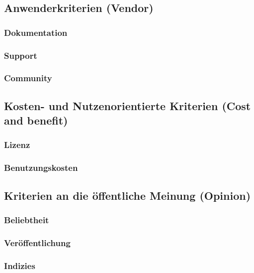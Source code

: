 \subsection{Anwenderkriterien (Vendor)}
\subsubsection{Dokumentation}

\subsubsection{Support}

\subsubsection{Community}


\subsection{Kosten- und Nutzenorientierte Kriterien (Cost and benefit)}
\subsubsection{Lizenz}

\subsubsection{Benutzungskosten}


\subsection{Kriterien an die öffentliche Meinung (Opinion)}
\subsubsection{Beliebtheit}

\subsubsection{Veröffentlichung}

\subsubsection{Indizies}


